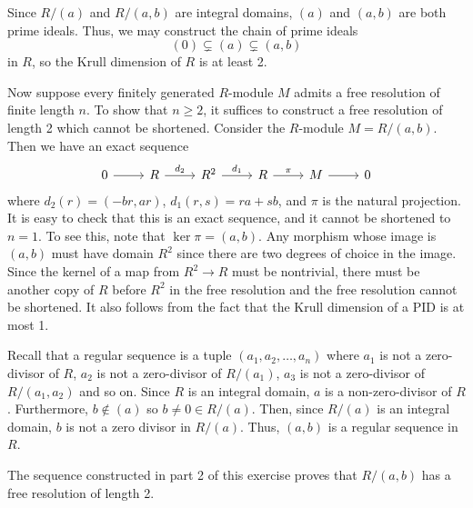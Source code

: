 \documentclass[../../master.tex]{subfiles}
\begin{document}
\begin{solution}
    Since $R / (a)$ and $R / (a, b)$ are integral domains, $(a)$ and $(a, b)$ are both prime ideals.
    Thus, we may construct the chain of prime ideals
    \[
        (0) \subsetneq (a) \subsetneq (a, b)
    \]
    in $R$, so the Krull dimension of $R$ is at least 2.

    Now suppose every finitely generated $R$-module $M$ admits a free resolution of finite length $n$.
    To show that $n \geq 2$, it suffices to construct a free resolution of length 2 which cannot be shortened.
    Consider the $R$-module $M = R / (a, b)$.
    Then we have an exact sequence
    \[
    \begin{tikzcd}
        0 & R & R^2 & R & M & 0
        \arrow[from=1-1, to=1-2] 
        \arrow[from=1-2, to=1-3, "d_2"] 
        \arrow[from=1-3, to=1-4, "d_1"] 
        \arrow[from=1-4, to=1-5, "\pi"] 
        \arrow[from=1-5, to=1-6] 
    \end{tikzcd}
    \]
    where $d_2(r) = (-br, ar)$, $d_1(r, s) = ra + sb$, and $\pi$ is the natural projection.
    It is easy to check that this is an exact sequence, and it cannot be shortened to $n = 1$.
    To see this, note that $\ker \pi = (a, b)$.
    Any morphism whose image is $(a, b)$ must have domain $R^2$ since there are two degrees of choice in the image.
    Since the kernel of a map from $R^2 \to R$ must be nontrivial, there must be another copy of $R$ before $R^2$ in the free resolution and the free resolution cannot be shortened.
    It also follows from the fact that the Krull dimension of a PID is at most 1.

    Recall that a regular sequence is a tuple $(a_1, a_2, \ldots, a_n)$ where $a_1$ is not a zero-divisor of $R$, $a_2$ is not a zero-divisor of $R / (a_1)$, $a_3$ is not a zero-divisor of $R / (a_1, a_2)$ and so on.
    Since $R$ is an integral domain, $a$ is a non-zero-divisor of $R$.
    Furthermore, $b \notin (a)$ so $b \neq 0 \in R / (a)$.
    Then, since $R / (a)$ is an integral domain, $b$ is not a zero divisor in $R / (a)$.
    Thus, $(a, b)$ is a regular sequence in $R$.

    The sequence constructed in part 2 of this exercise proves that $R / (a, b)$ has a free resolution of length 2.
\end{solution}
\end{document}
